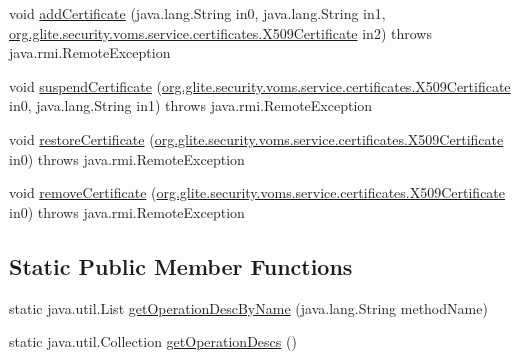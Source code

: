 \begin{DoxyCompactItemize}
\item 
void \hyperlink{classorg_1_1glite_1_1security_1_1voms_1_1service_1_1certificates_1_1VOMSCertificatesSoapBindingSkeleton_a40a90db8022cb4695708be3951d70647}{addCertificate} (java.lang.String in0, java.lang.String in1, \hyperlink{classorg_1_1glite_1_1security_1_1voms_1_1service_1_1certificates_1_1X509Certificate}{org.glite.security.voms.service.certificates.X509Certificate} in2)  throws java.rmi.RemoteException     
\item 
void \hyperlink{classorg_1_1glite_1_1security_1_1voms_1_1service_1_1certificates_1_1VOMSCertificatesSoapBindingSkeleton_aab734562710214035ff6f91eb25c7b87}{suspendCertificate} (\hyperlink{classorg_1_1glite_1_1security_1_1voms_1_1service_1_1certificates_1_1X509Certificate}{org.glite.security.voms.service.certificates.X509Certificate} in0, java.lang.String in1)  throws java.rmi.RemoteException     
\item 
void \hyperlink{classorg_1_1glite_1_1security_1_1voms_1_1service_1_1certificates_1_1VOMSCertificatesSoapBindingSkeleton_a2639ccb71c5cdfd6a86b4770b7a1e62a}{restoreCertificate} (\hyperlink{classorg_1_1glite_1_1security_1_1voms_1_1service_1_1certificates_1_1X509Certificate}{org.glite.security.voms.service.certificates.X509Certificate} in0)  throws java.rmi.RemoteException     
\item 
void \hyperlink{classorg_1_1glite_1_1security_1_1voms_1_1service_1_1certificates_1_1VOMSCertificatesSoapBindingSkeleton_a586c1ae77ddcdbc41abf9dca5d308295}{removeCertificate} (\hyperlink{classorg_1_1glite_1_1security_1_1voms_1_1service_1_1certificates_1_1X509Certificate}{org.glite.security.voms.service.certificates.X509Certificate} in0)  throws java.rmi.RemoteException     
\end{DoxyCompactItemize}
\subsection*{Static Public Member Functions}
\begin{DoxyCompactItemize}
\item 
static java.util.List \hyperlink{classorg_1_1glite_1_1security_1_1voms_1_1service_1_1certificates_1_1VOMSCertificatesSoapBindingSkeleton_aa8fa393daa02dc2a9aca6f7ac079c574}{getOperationDescByName} (java.lang.String methodName)
\item 
static java.util.Collection \hyperlink{classorg_1_1glite_1_1security_1_1voms_1_1service_1_1certificates_1_1VOMSCertificatesSoapBindingSkeleton_a963b4b3dc0f5b705f17f950e70020824}{getOperationDescs} ()
\end{DoxyCompactItemize}

